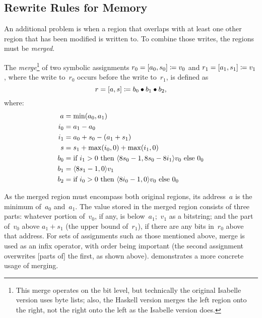 \subsection{Rewrite Rules for Memory}\label{memory_rewrite}
An additional problem is when a region that overlaps with at least one other region
that has been modified is written to.
To combine those writes, the regions must be \emph{merged}.%
\begin{definition}[Merging]\label{def:merge}
  The \emph{merge}\footnote{%
    This merge operates on the bit level,
    but technically the original Isabelle version uses byte lists;
    also, the Haskell version merges the left region onto the right,
    not the right onto the left as the Isabelle version does.%
  }
  of two symbolic assignments
  $r_0=[a_0,s_0]\coloneqq v_0$ and $r_1=[a_1,s_1]\coloneqq v_1$,
  where the write to~$r_0$ occurs before the write to~$r_1$,
  is defined as
  \begin{equation}
    r=[a,s]\coloneqq b_0\bullet b_1\bullet b_2,
  \end{equation}
  where:
  \begin{align*}
    a   &= \min(a_0, a_1) \\
    i_0 &= a_1 - a_0 \\
    i_1 &= a_0 + s_0 - (a_1 + s_1) \\
    s   &= s_1 + \max(i_0, 0) + \max(i_1, 0) \\
    b_0 &= \text{if } i_1 > 0 \text{ then }
      \langle8 s_0 - 1, 8 s_0 - 8 i_1\rangle v_0 \text{ else } 0_0 \\
    b_1 &= \langle8 s_1 - 1, 0\rangle v_1 \\
    b_2 &= \text{if } i_0 > 0 \text{ then }
      \langle8 i_0-1, 0\rangle v_0 \text{ else } 0_0
  \end{align*}
\end{definition}
As the merged region must encompass both original regions,
its address~$a$ is the minimum of~$a_0$ and~$a_1$.
The value stored in the merged region consists of three parts:
whatever portion of~$v_0$, if any, is below~$a_1$;~$v_1$ as a bitstring;
and the part of~$v_0$ above $a_1+s_1$ (the upper bound of~$r_1$),
if there are any bits in~$r_0$ above that address.
For sets of assignments such as those mentioned above,
merge is used as an infix operator, with order being important
(the second assignment overwrites [parts of] the first, as shown above).
 demonstrates a more concrete usage of merging.

